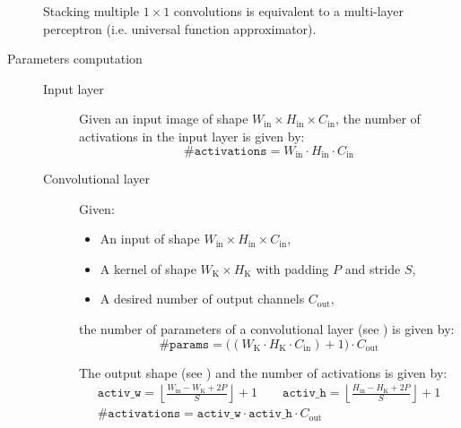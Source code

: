 \begin{description}
        \begin{remark}
            Stacking multiple $1 \times 1$ convolutions is equivalent to a multi-layer perceptron 
            (i.e. universal function approximator).
        \end{remark}

    \item[Parameters computation] 
        \phantom{}
        \begin{description}
            \item[Input layer]
                Given an input image of shape $W_\text{in} \times H_\text{in} \times C_\text{in}$,
                the number of activations in the input layer is given by:
                \[ \texttt{\#activations} = W_\text{in} \cdot H_\text{in} \cdot C_\text{in} \]


            \item[Convolutional layer]
                Given:
                \begin{itemize}
                    \item An input of shape $W_\text{in} \times H_\text{in} \times C_\text{in}$,
                    \item A kernel of shape $W_\text{K} \times H_\text{K}$ with padding $P$ and stride $S$,
                    \item A desired number of output channels $C_\text{out}$,
                \end{itemize}
                the number of parameters of a convolutional layer (see ) is given by:
                \[ \texttt{\#params} = \big( (W_\text{K} \cdot H_\text{K} \cdot C_\text{in}) + 1 \big) \cdot C_\text{out} \]

                The output shape (see ) and the number of activations is given by:
                \[  
                    \begin{gathered}
                        \texttt{activ\_w} = \left\lfloor \frac{W_\text{in} - W_\text{K} + 2P}{S} \right\rfloor + 1 \hspace{2em}
                        \texttt{activ\_h} = \left\lfloor \frac{H_\text{in} - H_\text{K} + 2P}{S} \right\rfloor + 1 \\
                        \texttt{\#activations} = \texttt{activ\_w} \cdot \texttt{activ\_h} \cdot C_\text{out}
                    \end{gathered}    
                \]


\end{description}
\end{description}
